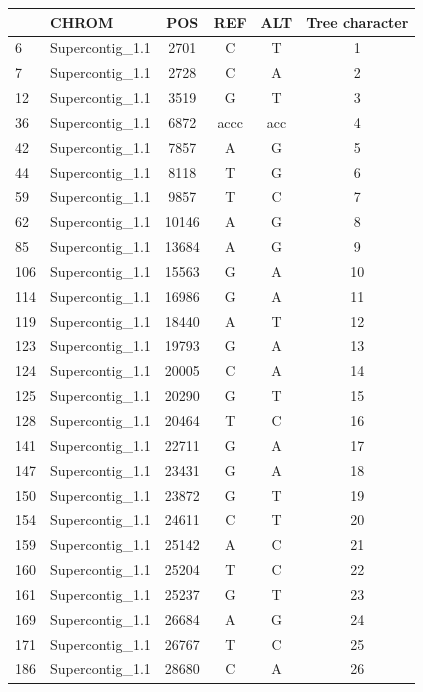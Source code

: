 \documentclass{article}\usepackage[]{graphicx}\usepackage[]{color}
\begin{document}
\begin{table}[ht]
\centering
\begin{tabular}{llcccc}
  \hline
 & CHROM & POS & REF & ALT & Tree character \\ 
  \hline
6 & Supercontig\_1.1 & 2701 & C & T &   1 \\ 
  7 & Supercontig\_1.1 & 2728 & C & A &   2 \\ 
  12 & Supercontig\_1.1 & 3519 & G & T &   3 \\ 
  36 & Supercontig\_1.1 & 6872 & accc & acc &   4 \\ 
  42 & Supercontig\_1.1 & 7857 & A & G &   5 \\ 
  44 & Supercontig\_1.1 & 8118 & T & G &   6 \\ 
  59 & Supercontig\_1.1 & 9857 & T & C &   7 \\ 
  62 & Supercontig\_1.1 & 10146 & A & G &   8 \\ 
  85 & Supercontig\_1.1 & 13684 & A & G &   9 \\ 
  106 & Supercontig\_1.1 & 15563 & G & A &  10 \\ 
  114 & Supercontig\_1.1 & 16986 & G & A &  11 \\ 
  119 & Supercontig\_1.1 & 18440 & A & T &  12 \\ 
  123 & Supercontig\_1.1 & 19793 & G & A &  13 \\ 
  124 & Supercontig\_1.1 & 20005 & C & A &  14 \\ 
  125 & Supercontig\_1.1 & 20290 & G & T &  15 \\ 
  128 & Supercontig\_1.1 & 20464 & T & C &  16 \\ 
  141 & Supercontig\_1.1 & 22711 & G & A &  17 \\ 
  147 & Supercontig\_1.1 & 23431 & G & A &  18 \\ 
  150 & Supercontig\_1.1 & 23872 & G & T &  19 \\ 
  154 & Supercontig\_1.1 & 24611 & C & T &  20 \\ 
  159 & Supercontig\_1.1 & 25142 & A & C &  21 \\ 
  160 & Supercontig\_1.1 & 25204 & T & C &  22 \\ 
  161 & Supercontig\_1.1 & 25237 & G & T &  23 \\ 
  169 & Supercontig\_1.1 & 26684 & A & G &  24 \\ 
  171 & Supercontig\_1.1 & 26767 & T & C &  25 \\ 
  186 & Supercontig\_1.1 & 28680 & C & A &  26 \\ 

\end{tabular}
\end{table}
\end{document}
